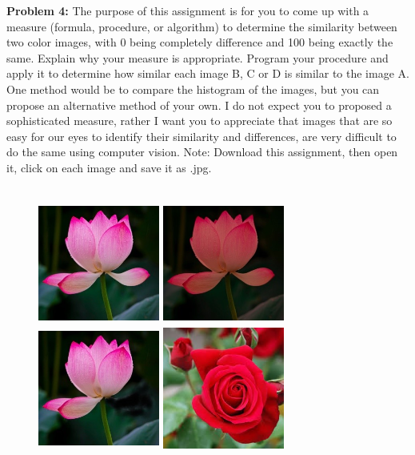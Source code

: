 \documentclass[11pt]{article}
\newenvironment{problem}[1]{\textbf{Problem #1: }}{\newpage}
\begin{document}
	\begin{problem}{4}
		The purpose of this assignment is for you to come up with a measure (formula, procedure, or algorithm) to determine the similarity between two color images, with 0 being completely difference and 100 being exactly the same. Explain why your measure is appropriate. Program your procedure and apply it to determine how similar each image B, C or D is similar to the image A. One method would be to compare the histogram of the images, but you can propose an alternative method of your own. I do not expect you to proposed a sophisticated measure, rather I want you to appreciate that images that are so easy for our eyes to identify their similarity and differences, are very difficult to do the same using computer vision. Note: Download this assignment, then open it, click on each image and save it as .jpg. 
		\\ \\
		\begin{figure}[h!]
			\includegraphics[width = 4cm, height = 4cm]{Photos/A.jpg}
			\includegraphics[width = 4cm, height = 4cm]{Photos/B.jpg}
			\includegraphics[width = 4cm, height = 4cm]{Photos/C.jpg}
			\includegraphics[width = 4cm, height = 4cm]{Photos/D.jpg}

\end{figure}
\end{problem}
\end{document}

